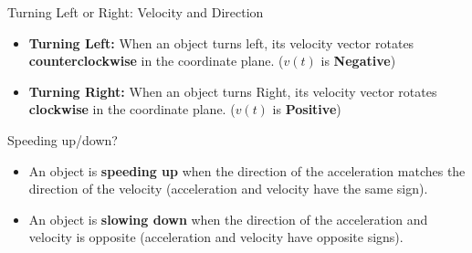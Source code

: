\documentclass[12pt]{article}
\theoremstyle{beautifulthm}
\begin{document}
\begin{Note}{Turning Left or Right: Velocity and Direction}{}

\begin{itemize}

    \item \textbf{Turning Left:}
    When an object turns left, its velocity vector rotates \textbf{counterclockwise} in the coordinate plane. ($v(t)$ is \textbf{Negative})

        \item \textbf{Turning Right:}
    When an object turns Right, its velocity vector rotates \textbf{clockwise} in the coordinate plane. ($v(t)$ is \textbf{Positive})
\end{itemize}


\end{Note}



\begin{Note}{Speeding up/down?}{}

\begin{itemize}
    \item An object is \textbf{speeding up} when the direction of the acceleration matches the direction of the velocity (acceleration and velocity have the same sign).
    \item An object is \textbf{slowing down} when the direction of the acceleration and velocity is opposite (acceleration and velocity have opposite signs).
\end{itemize}


\end{Note}
\end{document}
